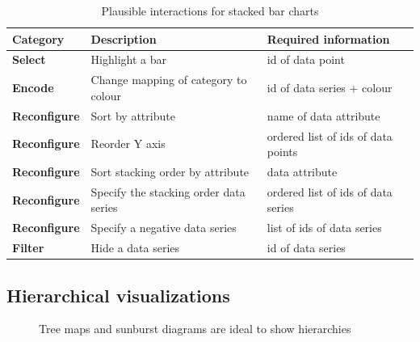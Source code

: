 \begin{table}[H]
  \begin{tabular*}{\textwidth}{lll}
    \bf Category & \bf Description & \bf Required information \\
    \hline
    \bf Select & Highlight a bar & id of data point \\
    \bf Encode & Change mapping of category to colour & id of data series + colour \\
    \bf Reconfigure & Sort by attribute & name of data attribute \\
    \bf Reconfigure & Reorder Y axis & ordered list of ids of data points \\
    \bf Reconfigure & Sort stacking order by attribute & data attribute \\
    \bf Reconfigure & Specify the stacking order data series & ordered list of ids of data series \\
    \bf Reconfigure & Specify a negative data series & list of ids of data series \\
    \bf Filter & Hide a data series & id of data series \\
  \end{tabular*}
  \caption{Plausible interactions for stacked bar charts}%
  \label{tab:analysis:stacked-bar-chart:interactions}
\end{table}


\subsection{Hierarchical visualizations}

\begin{figure}
  \centering
    \qquad
    \caption{Tree maps and sunburst diagrams are ideal to show hierarchies}%
    \label{fig:analysis:hierarchies}
\end{figure}

